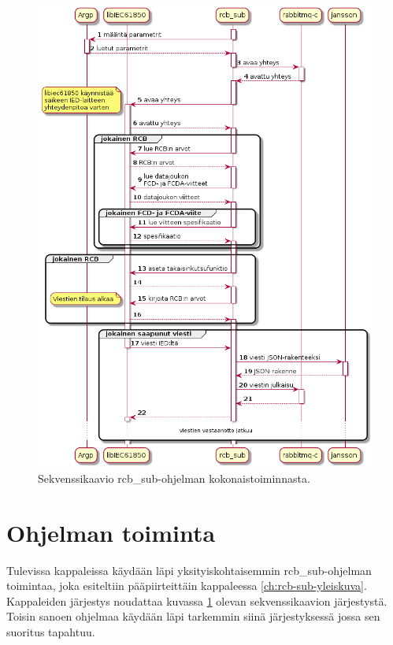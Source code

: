 \begin{figure}[ht!]
	\includegraphics[width=1\textwidth]{pictures/rcb-sub-general-sd.png}
	\caption{Sekvenssikaavio rcb\_sub-ohjelman kokonaistoiminnasta.}
	\label{fig:rcb-sub-sekvenssikaavio}
\end{figure}


\section{Ohjelman toiminta}
\label{rcb-sub-toiminta}
Tulevissa kappaleissa käydään läpi yksityiskohtaisemmin rcb\_sub-ohjelman toimintaa, joka esiteltiin pääpiirteittäin kappaleessa \ref{ch:rcb-sub-yleiskuva}. Kappaleiden järjestys noudattaa kuvassa \ref{fig:rcb-sub-sekvenssikaavio} olevan sekvenssikaavion järjestystä. Toisin sanoen ohjelmaa käydään läpi tarkemmin siinä järjestyksessä jossa sen suoritus tapahtuu.


